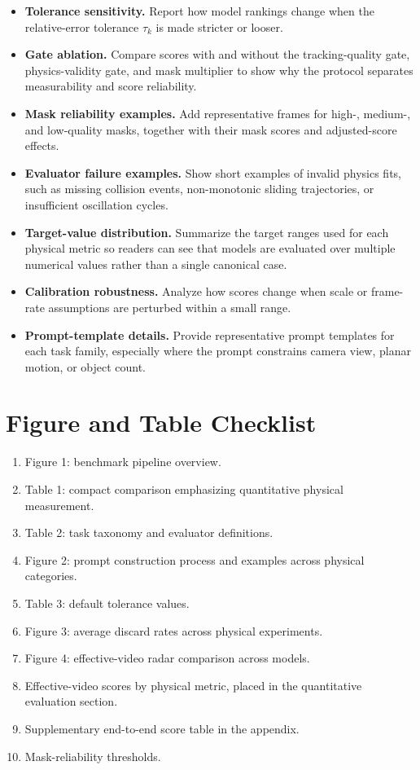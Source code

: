 \documentclass{article}
\begin{document}
\begin{itemize}[leftmargin=1.3em]
    \item \textbf{Tolerance sensitivity.} Report how model rankings change when the relative-error tolerance $\tau_k$ is made stricter or looser.
    \item \textbf{Gate ablation.} Compare scores with and without the tracking-quality gate, physics-validity gate, and mask multiplier to show why the protocol separates measurability and score reliability.
    \item \textbf{Mask reliability examples.} Add representative frames for high-, medium-, and low-quality masks, together with their mask scores and adjusted-score effects.
    \item \textbf{Evaluator failure examples.} Show short examples of invalid physics fits, such as missing collision events, non-monotonic sliding trajectories, or insufficient oscillation cycles.
    \item \textbf{Target-value distribution.} Summarize the target ranges used for each physical metric so readers can see that models are evaluated over multiple numerical values rather than a single canonical case.
    \item \textbf{Calibration robustness.} Analyze how scores change when scale or frame-rate assumptions are perturbed within a small range.
    \item \textbf{Prompt-template details.} Provide representative prompt templates for each task family, especially where the prompt constrains camera view, planar motion, or object count.
\end{itemize}

\section{Figure and Table Checklist}

\begin{enumerate}[leftmargin=1.5em]
    \item Figure 1: benchmark pipeline overview.
    \item Table 1: compact comparison emphasizing quantitative physical measurement.
    \item Table 2: task taxonomy and evaluator definitions.
    \item Figure 2: prompt construction process and examples across physical categories.
    \item Table 3: default tolerance values.
    \item Figure 3: average discard rates across physical experiments.
    \item Figure 4: effective-video radar comparison across models.
    \item Effective-video scores by physical metric, placed in the quantitative evaluation section.
    \item Supplementary end-to-end score table in the appendix.
    \item Mask-reliability thresholds.
\end{enumerate}
\end{document}
